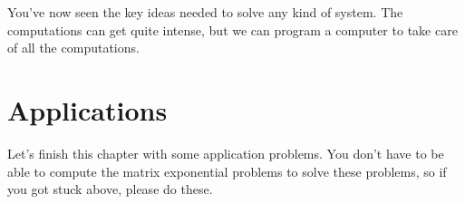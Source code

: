 You've now seen the key ideas needed to solve any kind of system. The computations can get quite intense, but we can program a computer to take care of all the computations.  



\section{Applications}
Let's finish this chapter with some application problems.  You don't have to be able to compute the matrix exponential problems to solve these problems, so if you got stuck above, please do these. 

